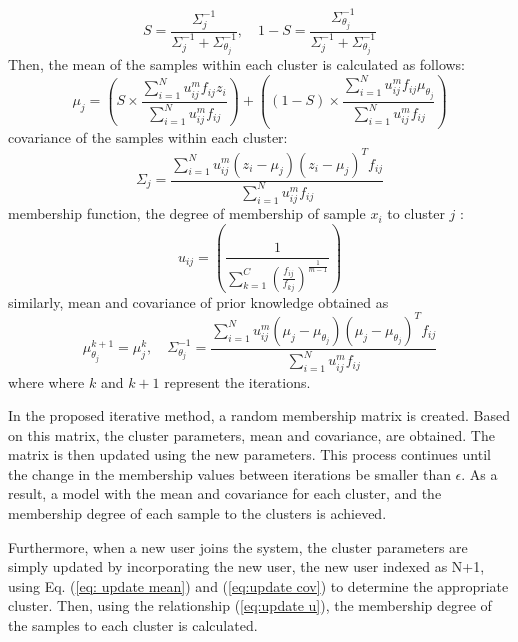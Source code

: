 \documentclass{article}
\begin{document}
\begin{equation}\label{eq: aux S}
    S = \frac{\Sigma_j^{-1}}{\Sigma_j^{-1} + \Sigma_{\theta_j}^{-1}}, \quad 1 - S = \frac{\Sigma_{\theta_j}^{-1}}{\Sigma_j^{-1} + \Sigma_{\theta_j}^{-1}}
\end{equation}
Then, the mean of the samples within each cluster is calculated as follows:
\begin{equation}\label{eq: update mean}
    \mu_j = \left( S \times \frac{\sum_{i=1}^{N} u_{ij}^{m} f_{ij} z_i}{\sum_{i=1}^{N} u_{ij}^{m} f_{ij}} \right) 
+ \left( (1-S) \times \frac{\sum_{i=1}^{N} u_{ij}^{m} f_{ij} \mu_{\theta_j}}{\sum_{i=1}^{N} u_{ij}^{m} f_{ij}} \right)
\end{equation}
covariance of the samples within each cluster: 
\begin{equation}\label{eq:update cov}
    \Sigma_j = \frac{\sum_{i=1}^{N} u_{ij}^{m} (z_i - \mu_j) (z_i - \mu_j)^T f_{ij}}{\sum_{i=1}^{N} u_{ij}^{m} f_{ij}}
\end{equation}
membership function, the degree of membership of sample $x_i$ to cluster $j$ :
\begin{equation}\label{eq:update u}
    u_{ij} = \left( \frac{1}{\sum_{k=1}^{C} \left( \frac{f_{ij}}{f_{kj}} \right)^{\frac{1}{m-1}}} \right)
\end{equation}
similarly, mean and covariance of prior knowledge obtained as
\begin{equation}\label{eq:update prior}
    \mu_{\theta_j}^{k+1} = \mu_j^{k} , \quad \Sigma_{\theta_j}^{-1} = \frac{\sum_{i=1}^{N} u_{ij}^{m} (\mu_j - \mu_{\theta_j}) (\mu_j - \mu_{\theta_j})^T f_{ij}}{\sum_{i=1}^{N} u_{ij}^{m} f_{ij}}
\end{equation}
where where $k$ and $k+1$ represent the iterations.

In the proposed iterative method, a random membership matrix is created. Based on this matrix, the cluster parameters, mean and covariance, are obtained. The matrix is then updated using the new parameters. This process continues until the change in the membership values between iterations be smaller than $\epsilon$. As a result, a model with the mean and covariance for each cluster, and the membership degree of each sample to the clusters is achieved.


Furthermore, when a new user joins the system, the cluster parameters are simply updated by incorporating the new user, the new user indexed as N+1,  using Eq. (\ref{eq: update mean}) and (\ref{eq:update cov}) to determine the appropriate cluster. Then, using the relationship (\ref{eq:update u}), the membership degree of the samples to each cluster is calculated.
\end{document}
